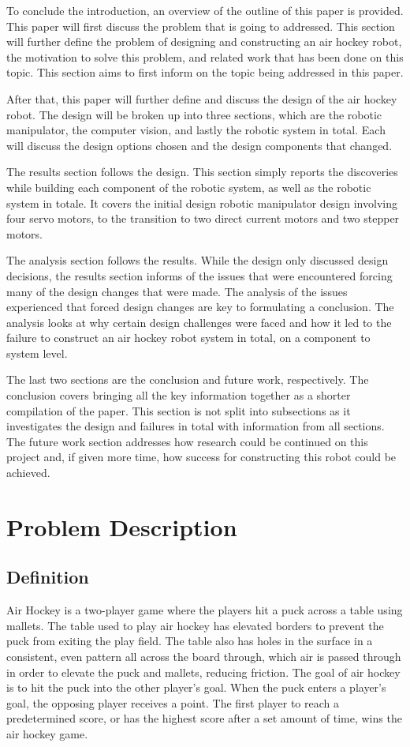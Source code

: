 \documentclass[letterpaper, 12 pt, conference]{ieeeconf}
\begin{document}
To conclude the introduction, an overview of the outline of this paper is provided. This paper will first discuss the problem that is going to addressed. This section will further define the problem of designing and constructing an air hockey robot, the motivation to solve this problem, and related work that has been done on this topic. This section aims to first inform on the topic being addressed in this paper.

After that, this paper will further define and discuss the design of the air hockey robot. The design will be broken up into three sections, which are the robotic manipulator, the computer vision, and lastly the robotic system in total. Each will discuss the design options chosen and the design components that changed. 

The results section follows the design. This section simply reports the discoveries while building each component of the robotic system, as well as the robotic system in totale. It covers the initial design robotic manipulator design involving four servo motors, to the transition to two direct current motors and two stepper motors. 

The analysis section follows the results. While the design only discussed design decisions, the results section informs of the issues that were encountered forcing many of the design changes that were made. The analysis of the issues experienced that forced design changes are key to formulating a conclusion. The analysis looks at why certain design challenges were faced and how it led to the failure to construct an air hockey robot system in total, on a component to system level.

The last two sections are the conclusion and future work, respectively. The conclusion covers bringing all the key information together as a shorter compilation of the paper. This section is not split into subsections as it investigates the design and failures in total with information from all sections. The future work section addresses how research could be continued on this project and, if given more time, how success for constructing this robot could be achieved.

\section{Problem Description}
\label{problemdescription}
\subsection{Definition}
\label{definition}
Air Hockey is a two-player game where the players hit a puck across a table using mallets. The table used to play air hockey has elevated borders to prevent the puck from exiting the play field.  The table also has holes in the surface in a consistent, even pattern all across the board through, which air is passed through in order to elevate the puck and mallets, reducing friction. The goal of air hockey is to hit the puck into the other player’s goal. When the puck enters a player’s goal, the opposing player receives a point.  The first player to reach a predetermined score, or has the highest score after a set amount of time, wins the air hockey game.
\end{document}
